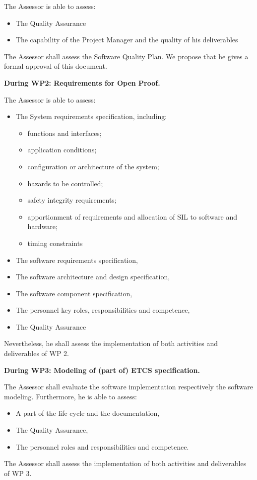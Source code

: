 The Assessor is able to assess:
\begin{itemize}\itemsep=0pt
  \item The Quality Assurance
  \item The capability of the Project Manager and the quality of his deliverables
 \end{itemize}

The Assessor shall assess the Software Quality Plan. We propose that he gives a formal approval of this document.


\textbf{
During WP2: Requirements for Open Proof.
}


The Assessor is able to assess:
\begin{itemize}\itemsep=0pt
  \item The System requirements specification, including:
  \begin{itemize}\itemsep=3pt
    \item functions and interfaces;
    \item application conditions;
    \item configuration or architecture of the system;
    \item hazards to be controlled;
    \item safety integrity requirements;
    \item apportionment of requirements and allocation of SIL to software and hardware;
    \item timing constraints
   \end{itemize}
  \item The software requirements specification,
  \item The software architecture and design specification,
  \item The software component specification,
  \item The personnel key roles, responsibilities and competence,
  \item The Quality Assurance
 \end{itemize}
Nevertheless, he shall assess the implementation of both activities and deliverables of WP 2.


\textbf{
During WP3: Modeling of (part of) ETCS specification.
}

The Assessor shall evaluate the software implementation respectively the software modeling.
Furthermore, he is able to assess:
\begin{itemize}\itemsep=0pt
  \item A part of the life cycle and the documentation,
  \item The Quality Assurance,
  \item The personnel roles and responsibilities and competence.
 \end{itemize}
The Assessor shall assess the implementation of both activities and deliverables of WP 3.


